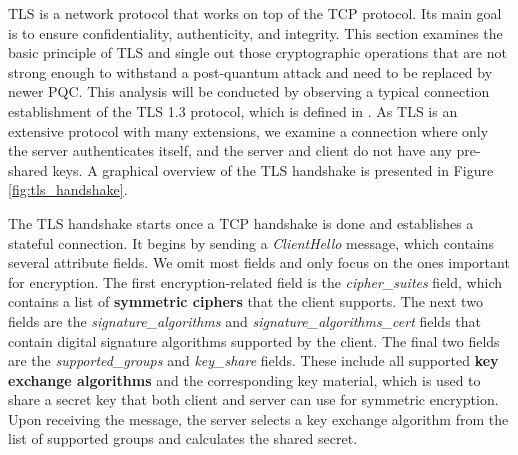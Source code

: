 \documentclass[public,noindent]{aisecreport}
\begin{document}
TLS is a network protocol that works on top of the TCP protocol. Its main goal is to ensure confidentiality, authenticity, and integrity. This section examines the basic principle of TLS and single out those cryptographic operations that are not strong enough to withstand a post-quantum attack and need to be replaced by newer PQC. This analysis will be conducted by observing a typical connection establishment of the TLS 1.3 protocol, which is defined in \cite{rescorla2018transport}. As TLS is an extensive protocol with many extensions, we examine a connection where only the server authenticates itself, and the server and client do not have any pre-shared keys. A graphical overview of the TLS handshake is presented in Figure \ref{fig:tls_handshake}.

The TLS handshake starts once a TCP handshake is done and establishes a stateful connection. It begins by sending a \textit{ClientHello} message, which contains several attribute fields. We omit most fields and only focus on the ones important for encryption. The first encryption-related field is the \textit{cipher\_suites} field, which contains a list of \textbf{symmetric ciphers} that the client supports. The next two fields are the \textit{signature\_algorithms} and \textit{signature\_algorithms\_cert} fields that contain digital signature algorithms supported by the client. The final two fields are the \textit{supported\_groups} and \textit{key\_share} fields. These include all supported \textbf{key exchange algorithms} and the corresponding key material, which is used to share a secret key that both client and server can use for symmetric encryption. Upon receiving the message, the server selects a key exchange algorithm from the list of supported groups and calculates the shared secret.
\end{document}
